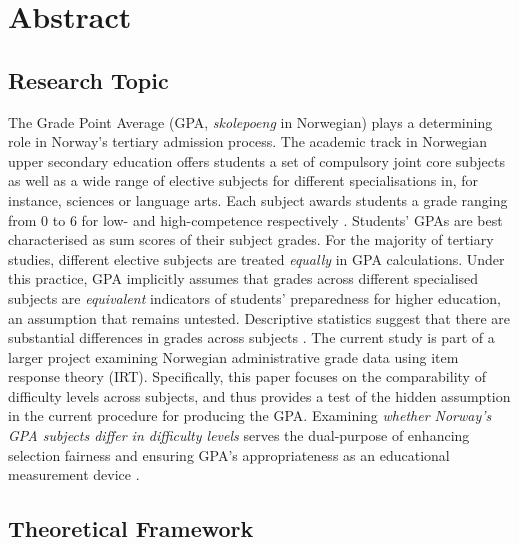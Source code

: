 \section{Abstract}


\subsection{Research Topic}

The Grade Point Average (GPA, \textit{skolepoeng} in Norwegian) plays a determining role in Norway's tertiary admission process. The academic track in Norwegian upper secondary education offers students a set of compulsory joint core subjects as well as a wide range of elective subjects for different specialisations in, for instance, sciences or language arts. Each subject awards students a grade ranging from $0$ to $6$ for low- and high-competence respectively \parencite[][\S 3-5]{lovdata:2006}. Students' GPAs are best characterised as sum scores of their subject grades. For the majority of tertiary studies, different elective subjects are treated \emph{equally} in GPA calculations. Under this practice, GPA implicitly assumes that grades across different specialised subjects are \emph{equivalent} indicators of students' preparedness for higher education, an assumption that remains untested. Descriptive statistics suggest that there are substantial differences in grades across subjects \parencite{udir:2022}. The current study is part of a larger project examining Norwegian administrative grade data using item response theory (IRT). Specifically, this paper focuses on the comparability of difficulty levels across subjects, and thus provides a test of the hidden assumption in the current procedure for producing the GPA. Examining \textit{whether Norway's GPA subjects differ in difficulty levels} serves the dual-purpose of enhancing selection fairness \parencite{camilli:2006} and ensuring GPA's appropriateness as an educational measurement device \parencite{standards:2014}.

\subsection{Theoretical Framework}



